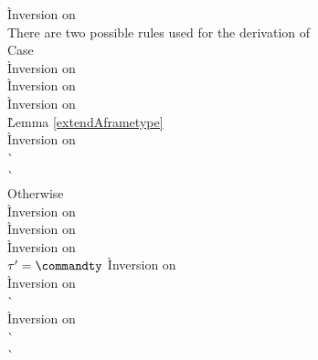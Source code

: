 \begin{description}
\begin{tabbing}
    \` Inversion on  \\
  There are two possible rules used for the derivation of  \\
  Case  \+ \\
      \` Inversion on  \\
      \` Inversion on  \\
      \` Inversion on  \\
      \` Lemma \ref{extendAframetype} \\
      \` Inversion on  \\
      \`  \\
      \`  \- \\
  Otherwise  \+ \\
      \` Inversion on  \\
      \` Inversion on  \\
      \` Inversion on  \\
    $\tau' = \commandty$
      \` Inversion on  \\
      \` Inversion on  \\
      \`  \\
      \` Inversion on  \\
      \`  \\
      \`  \\


\end{tabbing}
\end{description}
